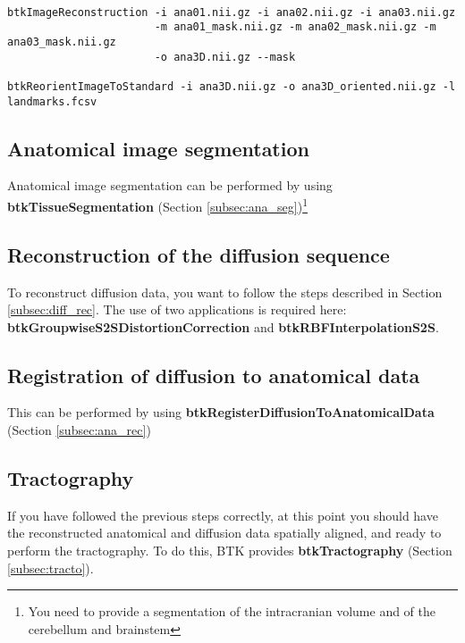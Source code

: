 \begin{verbatim}
 
btkImageReconstruction -i ana01.nii.gz -i ana02.nii.gz -i ana03.nii.gz 
                       -m ana01_mask.nii.gz -m ana02_mask.nii.gz -m ana03_mask.nii.gz
                       -o ana3D.nii.gz --mask

btkReorientImageToStandard -i ana3D.nii.gz -o ana3D_oriented.nii.gz -l landmarks.fcsv

\end{verbatim}

\subsection{Anatomical image segmentation}
Anatomical image segmentation can be performed by using \textbf{btkTissueSegmentation} (Section \ref{subsec:ana_seg})\footnote{You need to provide a segmentation of the intracranian volume and of the cerebellum and brainstem}


\subsection{Reconstruction of the diffusion sequence}
To reconstruct diffusion data, you want to follow the steps described in
Section \ref{subsec:diff_rec}. The use of two applications is required here:
\textbf{btkGroupwiseS2SDistortionCorrection} and
\textbf{btkRBFInterpolationS2S}.

\subsection{Registration of diffusion to anatomical data}
This can be performed by using \textbf{btkRegisterDiffusionToAnatomicalData}
(Section \ref{subsec:ana_rec})

\subsection{Tractography}
If you have followed the previous steps correctly, at this point you should
have the reconstructed anatomical and diffusion data spatially aligned, and
ready to perform the tractography. To do this, BTK provides
\textbf{btkTractography} (Section \ref{subsec:tracto}).
